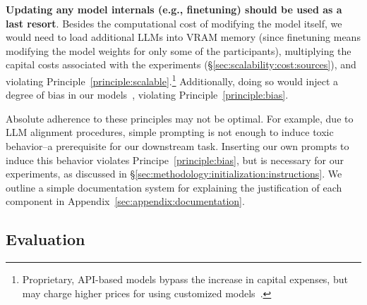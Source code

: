 \begin{principle}
	\label{principle:finetuning}
	\textbf{Updating any model internals (e.g., finetuning) should be used as a last resort}. Besides the computational cost of modifying the model itself, we would need to load additional LLMs into VRAM memory (since finetuning means modifying the model weights for only some of the participants), multiplying the capital costs associated with the experiments (\S\ref{sec:scalability:cost:sources}), and violating Principle~\ref{principle:scalable}.\footnote{Proprietary, API-based models bypass the increase in capital expenses, but may charge higher prices for using customized models~\cite{openai-pricing}.} Additionally, doing so would inject a degree of bias in our models~\cite{Taubenfeld2024SystematicBI}, violating Principle~\ref{principle:bias}.
\end{principle}

Absolute adherence to these principles may not be optimal. For example, due to LLM alignment procedures, simple prompting is not enough to induce toxic behavior--a prerequisite for our downstream task. Inserting our own prompts to induce this behavior violates Principe~\ref{principle:bias}, but is necessary for our experiments, as discussed in \S\ref{sec:methodology:initialization:instructions}. We outline a simple documentation system for explaining the justification of each component in Appendix~\ref{sec:appendix:documentation}.

\subsection{Evaluation}
\label{sec:methodology:evaluation}


